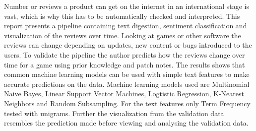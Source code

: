 Number or reviews a product can get on the internet in an international stage is vast, which is why this has to be automatically checked and interpreted. 
This report presents a pipeline containing text digestion, sentiment classification and visualization of the reviews over time. 
Looking at games or other software the reviews can change depending on updates, new content or bugs introduced to the users. 
To validate the pipeline the author predicts how the reviews change over time for a game using prior knowledge and patch notes. 
The results shows that common machine learning models can be used with simple text features to make accurate predictions on the data. 
Machine learning models used are Multinomial Naive Bayes, Linear Support Vector Machines, Logtistic Regression, K-Nearest Neighbors and Random Subsampling. 
For the text features only Term Frequency tested with unigrams. 
Further the visualization from the validation data resembles the prediction made before viewing and analysing the validation data.